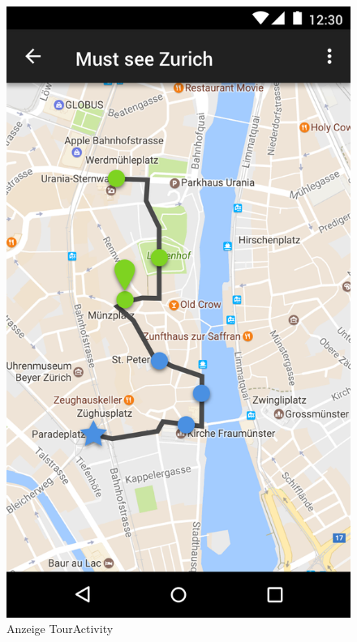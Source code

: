 \documentclass[a4paper,10pt,xetex]{article}
\begin{document}
\begin{figure}
  \centering
  \begin{minipage}[b]{0.48\textwidth}
    \includegraphics[width=\textwidth]{TourActivity}
    \caption{Anzeige TourActivity}
  \end{minipage}
  \hfill
  \begin{minipage}[b]{0.48\textwidth}

\end{minipage}
\end{figure}
\end{document}
